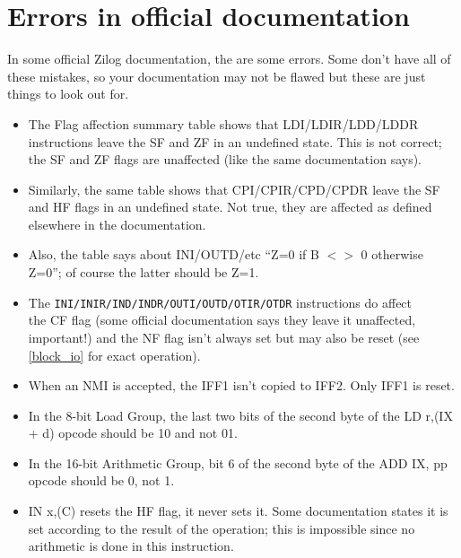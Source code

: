 \documentclass[oneside,a4paper]{book}
\begin{document}
\section{Errors in official documentation}

In some official Zilog documentation, the are some errors. Some don't
have all of these mistakes, so your documentation may not be flawed but 
these are just things to look out for.

\begin{itemize}

\item
  The Flag affection summary table shows that {\ttfamily LDI/LDIR/LDD/LDDR} 
  instructions leave the SF and ZF in an undefined state. This is not correct; 
  the SF and ZF flags are unaffected (like the same documentation says).

\item
  Similarly, the same table shows that {\ttfamily CPI/CPIR/CPD/CPDR} leave the 
  SF and HF flags in an undefined state. Not true, they are affected as defined 
  elsewhere in the documentation.

\item
  Also, the table says about {\ttfamily INI/OUTD/}etc 
  ``Z=0 if B $<>$ 0 otherwise Z=0''; of course the latter should be Z=1.

\item
  The {\tt INI/INIR/IND/INDR/OUTI/OUTD/OTIR/OTDR} instructions do affect\\
  the CF flag (some official documentation says they 
  leave it unaffected, important!) and the NF flag isn't always set but may 
  also be reset (see \ref{block_io} for exact operation).

\item
  When an NMI is accepted, the IFF1 isn't copied to IFF2. Only IFF1
  is reset.

\item
  In the 8-bit Load Group, the last two bits of the second byte of
  the {\ttfamily LD r,(IX + d)} opcode should be 10 and not 01.

\item
  In the 16-bit Arithmetic Group, bit 6 of the second byte of the
  {\ttfamily ADD IX, pp} opcode should be 0, not 1.

\item
  {\ttfamily IN x,(C)} resets the HF flag, it never sets it. Some 
  documentation states it is set according to the result of the operation; 
  this is impossible since no arithmetic is done in this instruction.
\end{itemize}
\end{document}
